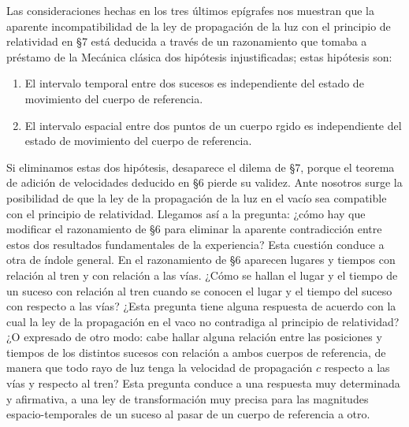 \documentclass[spanish]{book}
\begin{document}
Las consideraciones hechas en los tres últimos epígrafes nos muestran que la aparente
incompatibilidad de la ley de propagación de la luz con el principio de relatividad en
\S 7 está deducida a través de un razonamiento que tomaba a préstamo de la Mecánica
clásica dos hipótesis injustificadas; estas hipótesis son:

\begin{enumerate}
\item El intervalo temporal entre dos sucesos es independiente del estado de
movimiento del cuerpo de referencia.
\item El intervalo espacial entre dos puntos de un cuerpo rgido es
independiente del estado de movimiento del cuerpo de referencia.
\end{enumerate}

Si eliminamos estas dos hipótesis, desaparece el dilema de \S 7, porque el teorema de
adición de velocidades deducido en \S 6 pierde su validez. Ante nosotros surge la
posibilidad de que la ley de la propagación de la luz en el vacío sea compatible con el
principio de relatividad. Llegamos así a la pregunta: ¿cómo hay que modificar el
razonamiento de \S 6 para eliminar la aparente contradicción entre estos dos resultados
fundamentales de la experiencia? Esta cuestión conduce a otra de índole general. En
el razonamiento de \S 6 aparecen lugares y tiempos con relación al tren y con relación a
las vías. ¿Cómo se hallan el lugar y el tiempo de un suceso con relación al tren cuando
se conocen el lugar y el tiempo del suceso con respecto a las vías? ¿Esta pregunta
tiene alguna respuesta de acuerdo con la cual la ley de la propagación en el vaco no
contradiga al principio de relatividad? ¿O expresado de otro modo: cabe hallar alguna
relación entre las posiciones y tiempos de los distintos sucesos con relación a ambos
cuerpos de referencia, de manera que todo rayo de luz tenga la velocidad de
propagación $c$ respecto a las vías y respecto al tren? Esta pregunta conduce a una respuesta
muy determinada y afirmativa, a una ley de transformación muy precisa para las
magnitudes espacio-temporales de un suceso al pasar de un cuerpo de referencia a
otro.


\end{document}
